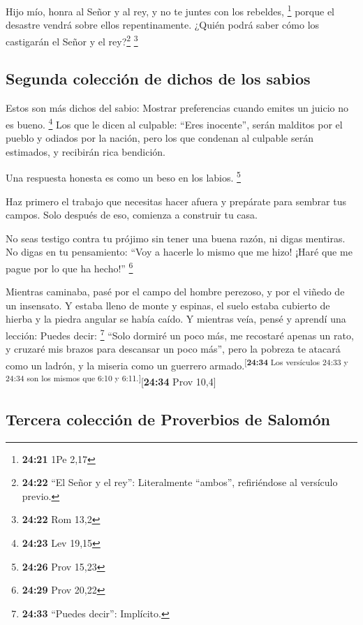  Hijo mío, honra al Señor y al rey, y no te juntes con
los rebeldes, \footnote{\textbf{24:21} 1Pe 2,17}  porque
el desastre vendrá sobre ellos repentinamente. ¿Quién podrá saber cómo
los castigarán el Señor y el rey?\footnote{\textbf{24:22} ``El Señor y
  el rey'': Literalmente ``ambos'', refiriéndose al versículo previo.}
\footnote{\textbf{24:22} Rom 13,2}

\hypertarget{segunda-colecciuxf3n-de-dichos-de-los-sabios}{%
\subsection{Segunda colección de dichos de los
sabios}\label{segunda-colecciuxf3n-de-dichos-de-los-sabios}}

 Estos son más dichos del sabio: Mostrar preferencias
cuando emites un juicio no es bueno. \footnote{\textbf{24:23} Lev 19,15}
 Los que le dicen al culpable: ``Eres inocente'', serán
malditos por el pueblo y odiados por la nación,  pero los
que condenan al culpable serán estimados, y recibirán rica bendición.

 Una respuesta honesta es como un beso en los labios.
\footnote{\textbf{24:26} Prov 15,23}

 Haz primero el trabajo que necesitas hacer afuera y
prepárate para sembrar tus campos. Solo después de eso, comienza a
construir tu casa.

 No seas testigo contra tu prójimo sin tener una buena
razón, ni digas mentiras.  No digas en tu pensamiento:
``Voy a hacerle lo mismo que me hizo! ¡Haré que me pague por lo que ha
hecho!'' \footnote{\textbf{24:29} Prov 20,22}

 Mientras caminaba, pasé por el campo del hombre
perezoso, y por el viñedo de un insensato.  Y estaba
lleno de monte y espinas, el suelo estaba cubierto de hierba y la piedra
angular se había caído.  Y mientras veía, pensé y aprendí
una lección:  Puedes decir: \footnote{\textbf{24:33}
  ``Puedes decir'': Implícito.} ``Solo dormiré un poco más, me recostaré
apenas un rato, y cruzaré mis brazos para descansar un poco más'',
 pero la pobreza te atacará como un ladrón, y la miseria
como un guerrero armado.\textsuperscript{{[}\textbf{24:34} Los
versículos 24:33 y 24:34 son los mismos que 6:10 y
6:11.{]}}{[}\textbf{24:34} Prov 10,4{]}

\hypertarget{tercera-colecciuxf3n-de-proverbios-de-salomuxf3n}{%
\subsection{Tercera colección de Proverbios de
Salomón}\label{tercera-colecciuxf3n-de-proverbios-de-salomuxf3n}}

